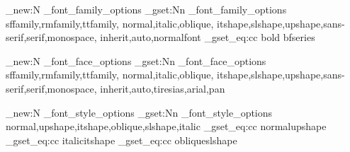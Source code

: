 \clist_new:N \allowed_font_family_options
\clist_gset:Nn \allowed_font_family_options
  {
    sffamily,rmfamily,ttfamily, normal,italic,oblique,
    itshape,slshape,upshape,sans-serif,serif,monospace,
    inherit,auto,normalfont
  }
\cs_gset_eq:cc {bold} {bfseries}


\ExplSyntaxOff
\ExplSyntaxOn
\clist_new:N \allowed_font_face_options
\clist_gset:Nn \allowed_font_face_options
  {
    sffamily,rmfamily,ttfamily, normal,italic,oblique,
    itshape,slshape,upshape,sans-serif,serif,monospace,
    inherit,auto,tiresias,arial,pan
  }


 \ExplSyntaxOff
\ExplSyntaxOn
\ExplSyntaxOff
\ExplSyntaxOn
\clist_new:N \allowed_font_style_options
\clist_gset:Nn \allowed_font_style_options {normal,upshape,itshape,oblique,slshape,italic}
\cs_gset_eq:cc {normal}{upshape}
\cs_gset_eq:cc {italic}{itshape}
\cs_gset_eq:cc {oblique}{slshape}


